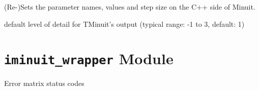 \documentclass[a4paper,10pt,english]{sphinxmanual}
\begin{document}
\begin{fulllineitems}
\begin{fulllineitems}
\end{fulllineitems}


\begin{fulllineitems}
\label{index:kafe.minuit.Minuit.update_parameter_data}
(Re-)Sets the parameter names, values and step size on the
C++ side of Minuit.

\end{fulllineitems}


\end{fulllineitems}


\begin{fulllineitems}
\label{index:kafe.minuit.P_DETAIL_LEVEL}
default level of detail for TMinuit's output
(typical range: -1 to 3, default: 1)

\end{fulllineitems}



\section{\texttt{iminuit\_wrapper} Module}
\label{index:iminuit-wrapper-module}\label{index:module-kafe.iminuit_wrapper}\label{index:module-iminuit}

\begin{fulllineitems}
\label{index:kafe.iminuit_wrapper.D_MATRIX_ERROR}
Error matrix status codes

\end{fulllineitems}

\end{document}
